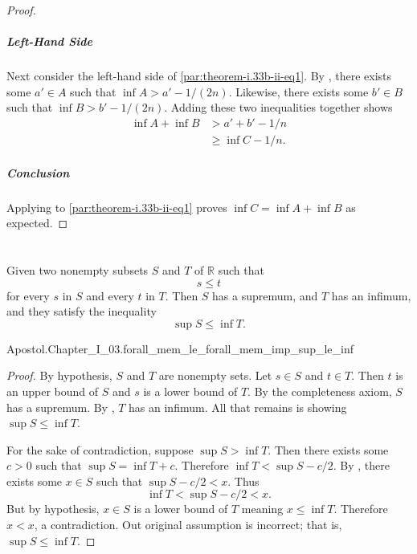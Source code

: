 \documentclass{report}
\begin{document}
\begin{proof}
      \subparagraph{Left-Hand Side}%

        Next consider the left-hand side of \eqref{par:theorem-i.33b-ii-eq1}.
        By , there exists some $a' \in A$ such that
          $\inf{A} > a' - 1 / (2n)$.
        Likewise, there exists some $b' \in B$ such that
          $\inf{B} > b' - 1 / (2n)$.
        Adding these two inequalities together shows
          \begin{align*}
            \inf{A} + \inf{B}
              & > a' + b' - 1 / n \\
              & \geq \inf{C} - 1 / n.
          \end{align*}

      \subparagraph{Conclusion}%

        Applying  to \eqref{par:theorem-i.33b-ii-eq1}
          proves $\inf{C} = \inf{A} + \inf{B}$ as expected.

  \end{proof}

\section{}%

  \begin{theorem}[I.34]
    Given two nonempty subsets $S$ and $T$ of $\mathbb{R}$ such that
      $$s \leq t$$ for every $s$ in $S$ and every $t$ in $T$. Then $S$ has a
      supremum, and $T$ has an infimum, and they satisfy the inequality
      $$\sup{S} \leq \inf{T}.$$
  \end{theorem}

    {Apostol.Chapter\_I\_03.forall\_mem\_le\_forall\_mem\_imp\_sup\_le\_inf}

  \begin{proof}
    By hypothesis, $S$ and $T$ are nonempty sets.
    Let $s \in S$ and $t \in T$.
    Then $t$ is an upper bound of $S$ and $s$ is a lower bound of $T$.
    By the completeness axiom, $S$ has a supremum.
    By , $T$ has an infimum.
    All that remains is showing $\sup{S} \leq \inf{T}$.

    For the sake of contradiction, suppose $\sup{S} > \inf{T}$.
    Then there exists some $c > 0$ such that $\sup{S} = \inf{T} + c$.
    Therefore $\inf{T} < \sup{S} - c / 2$.
    By , there exists some $x \in S$ such that
      $\sup{S} - c / 2 < x$.
    Thus $$\inf{T} < \sup{S} - c / 2 < x.$$
    But by hypothesis, $x \in S$ is a lower bound of $T$ meaning
      $x \leq \inf{T}$.
    Therefore $x < x$, a contradiction.
    Out original assumption is incorrect; that is, $\sup{S} \leq \inf{T}$.
  \end{proof}
\end{document}
